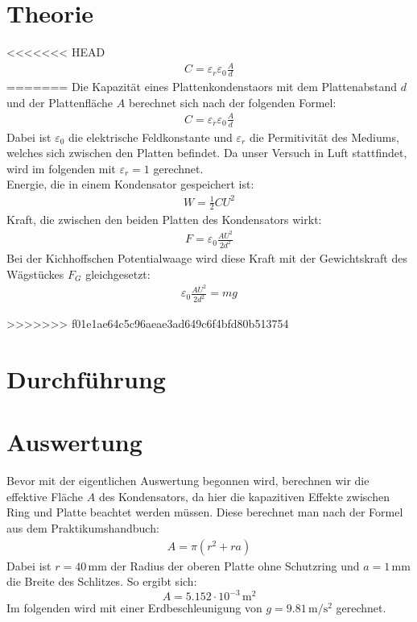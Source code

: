 \documentclass[12pt,a4paper,titlepage,headinclude,bibtotoc]{scrartcl}
\begin{document}
\section{Theorie}
\label{sec:theorie}
<<<<<<< HEAD
\begin{align}
	C=\varepsilon_r\varepsilon_0\frac{A}{d}
\end{align}
=======
Die Kapazität eines Plattenkondenstaors mit dem Plattenabstand $d$ und der Plattenfläche $A$ berechnet sich nach der folgenden Formel:
\begin{align}
 C=\varepsilon_r\varepsilon_0\frac{A}{d}
 \label{eq:C_Pl}
\end{align}
Dabei ist $\varepsilon_0$ die elektrische Feldkonstante und $\varepsilon_r$ die Permitivität des Mediums, welches sich zwischen den Platten befindet.
Da unser Versuch in Luft stattfindet, wird im folgenden mit $\varepsilon_r=1$ gerechnet.\\
Energie, die in einem Kondensator gespeichert ist:
\begin{align}
 W=\frac{1}{2} C U^2
\end{align}
Kraft, die zwischen den beiden Platten des Kondensators wirkt:
\begin{align}
 F=\varepsilon_0\frac{A U^2}{2 d^2}
 \label{eq:F_Pl}
\end{align}
Bei der Kichhoffschen Potentialwaage wird diese Kraft mit der Gewichtskraft des Wägstückes $F_G$ gleichgesetzt:
\begin{align}
 \varepsilon_0\frac{A U^2}{2 d^2}=mg
 \label{eq:PotWaage}
\end{align}

>>>>>>> f01e1ae64c5c96aeae3ad649c6f4bfd80b513754

\section{Durchführung}
\label{sec:durchfuehrung}

\section{Auswertung}
\label{sec:auswertung}
Bevor mit der eigentlichen Auswertung begonnen wird, berechnen wir die effektive Fläche $A$ des Kondensators, da hier die kapazitiven Effekte zwischen Ring und Platte beachtet werden müssen.
Diese berechnet man nach der Formel aus dem Praktikumshandbuch:
\begin{align*}
 A=\pi (r^2+ra)
\end{align*}
Dabei ist $r=40\,$mm der Radius der oberen Platte ohne Schutzring und $a=1\,$mm die Breite des Schlitzes.
So ergibt sich: $$A=5.152 \cdot 10^{-3}\,\si{\meter^2}$$
Im folgenden wird mit einer Erdbeschleunigung von $g=9.81\,\si{\meter\per\second^2}$ gerechnet.
\end{document}
